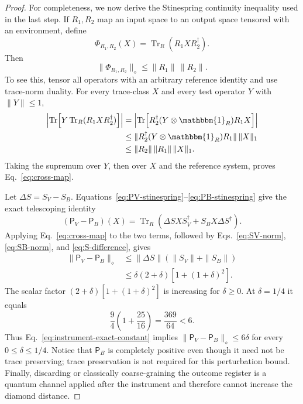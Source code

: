 \documentclass[aps,floatfix,10pt,amssymb,amsmath,superscriptaddress,nofootinbib,longbibliography,nobalancelastpage,twocolumn]{revtex4-2}
\newcommand{\id}{\mathbbm{1}}
\newcommand{\Tr}{\operatorname{Tr}}
\begin{document}
\begin{proof}
For completeness, we now derive the Stinespring continuity inequality used in the last step.  If $R_1,R_2$ map an input space to an output space tensored with an environment, define
\begin{equation}
 \Phi_{R_1,R_2}(X)=\Tr_R(R_1XR_2^\dagger).
\end{equation}
Then
\begin{equation}
 \|\Phi_{R_1,R_2}\|_\diamond\leq\|R_1\|\,\|R_2\|.
 \label{eq:cross-map}
\end{equation}
To see this, tensor all operators with an arbitrary reference identity and use trace-norm duality.  For every trace-class $X$ and every test operator $Y$ with $\|Y\|\leq1$,
\begin{align}
 \left|\Tr\!\left[Y\Tr_R(R_1XR_2^\dagger)\right]\right|
 &=\left|\Tr\!\left[R_2^\dagger(Y\otimes\id_R)R_1X\right]\right|\nonumber\\
 &\leq\|R_2^\dagger(Y\otimes\id_R)R_1\|\,\|X\|_1\nonumber\\
 &\leq\|R_2\|\,\|R_1\|\,\|X\|_1.
\end{align}
Taking the supremum over $Y$, then over $X$ and the reference system, proves Eq.~\eqref{eq:cross-map}.

Let $\Delta S=S_V-S_B$.  Equations~\eqref{eq:PV-stinespring}--\eqref{eq:PB-stinespring} give the exact telescoping identity
\begin{equation}
 (\mathsf P_V-\mathsf P_B)(X)
 =\Tr_R\!\left(\Delta SXS_V^\dagger
 +S_BX\Delta S^\dagger\right).
 \label{eq:instrument-telescope}
\end{equation}
Applying Eq.~\eqref{eq:cross-map} to the two terms, followed by Eqs.~\eqref{eq:SV-norm}, \eqref{eq:SB-norm}, and \eqref{eq:S-difference}, gives
\begin{align}
 \|\mathsf P_V-\mathsf P_B\|_\diamond
 &\leq\|\Delta S\|(\|S_V\|+\|S_B\|)\nonumber\\
 &\leq\delta(2+\delta)\left[1+(1+\delta)^2\right].
 \label{eq:instrument-exact-constant}
\end{align}
The scalar factor $(2+\delta)[1+(1+\delta)^2]$ is increasing for $\delta\geq0$.  At $\delta=1/4$ it equals
\begin{equation}
 \frac94\left(1+\frac{25}{16}\right)
 =\frac{369}{64}<6.
\end{equation}
Thus Eq.~\eqref{eq:instrument-exact-constant} implies
$\|\mathsf P_V-\mathsf P_B\|_\diamond\leq6\delta$ for every $0\leq\delta\leq1/4$.  Notice that $\mathsf P_B$ is completely positive even though it need not be trace preserving; trace preservation is not required for this perturbation bound.  Finally, discarding or classically coarse-graining the outcome register is a quantum channel applied after the instrument and therefore cannot increase the diamond distance.
\end{proof}
\end{document}
